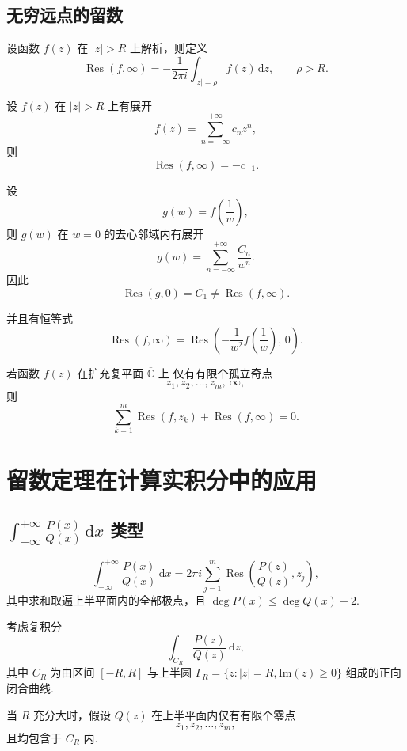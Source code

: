 \documentclass[openany,oneside]{ctexbook}
\begin{document}
\subsection{无穷远点的留数}
\begin{definition}
设函数 $f(z)$ 在 $|z|>R$ 上解析，则定义
\[
\operatorname{Res}(f,\infty)
=-\frac{1}{2\pi i}\int_{|z|=\rho} f(z)\,\mathrm{d}z,
\qquad \rho>R.
\]
\end{definition}
\begin{theorem}
设 $f(z)$ 在 $|z|>R$ 上有展开
\[
f(z)=\sum_{n=-\infty}^{+\infty} c_n z^n,
\]
则
\[
\operatorname{Res}(f,\infty)=-c_{-1}.
\]
\end{theorem}
\begin{remark}
设
\[
g(w)=f\!\left(\frac{1}{w}\right),
\]
则 $g(w)$ 在 $w=0$ 的去心邻域内有展开
\[
g(w)=\sum_{n=-\infty}^{+\infty} \frac{C_n}{w^n}.
\]
因此
\[
\operatorname{Res}(g,0)=C_1 \neq \operatorname{Res}(f,\infty).
\]

并且有恒等式
\[
\operatorname{Res}(f,\infty)
=\operatorname{Res}\!\left(-\frac{1}{w^2}f\!\left(\frac{1}{w}\right),\,0\right).
\]
\end{remark}
\begin{corollary}
若函数 $f(z)$ 在扩充复平面 $\overline{\mathbb C}$ 上
仅有有限个孤立奇点
\[
z_1,z_2,\dots,z_m,\ \infty,
\]
则
\[
\sum_{k=1}^{m} \operatorname{Res}(f,z_k)
+\operatorname{Res}(f,\infty)
=0.
\]
\end{corollary}

\section{留数定理在计算实积分中的应用}
\subsection{$
\int_{-\infty}^{+\infty}\frac{P(x)}{Q(x)}\,\mathrm{d}x
$ 类型}
\begin{proposition}
\[
\int_{-\infty}^{+\infty}\frac{P(x)}{Q(x)}\,\mathrm{d}x
=2\pi i\sum_{j=1}^{m}
\operatorname{Res}\!\left(\frac{P(z)}{Q(z)},z_j\right),
\]
其中求和取遍上半平面内的全部极点，且
$
\deg P(x)\le \deg Q(x)-2.
$
\end{proposition}
考虑复积分
\[
\int_{C_R}\frac{P(z)}{Q(z)}\,\mathrm{d}z,
\]
其中 $C_R$ 为由区间 $[-R,R]$ 与上半圆
$
\Gamma_R=\{z:|z|=R,\text{Im}(z)\ge0\}
$
组成的正向闭合曲线.

当 $R$ 充分大时，假设 $Q(z)$ 在上半平面内仅有有限个零点
\[
z_1,z_2,\dots,z_m,
\]
且均包含于 $C_R$ 内.
\end{document}
